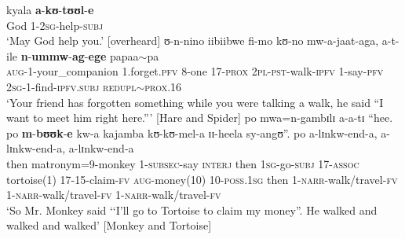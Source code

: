 \begin{exe}
\ex \label{exSUBJvolitive1}
\gll kyala \textbf{a}-\textbf{kʊ}-\textbf{tʊʊl}-\textbf{e}\\
God 1-\textsc{2sg}-help-\textsc{subj}\\
\glt `May God help you.' [overheard]
\ex \label{exSUBJvolitive2}
\gll ʊ-n-nino iibiibwe fi-mo kʊ-no mw-a-jaat-aga, a-t-ile \textbf{n}-\textbf{ummw}-\textbf{ag}-\textbf{ege} papaa$\sim$pa\\
\textsc{aug}-1-your\_companion \textsc{1}.forget.\textsc{pfv} 8-one 17-\textsc{prox} \textsc{2pl}-\textsc{pst}-walk-\textsc{ipfv} 1-say-\textsc{pfv} \textsc{2sg}-1-find-\textsc{ipfv.subj} \textsc{redupl}$\sim$\textsc{prox.16}\\
\glt `Your friend has forgotten something while you were talking a walk, he said ``I want to meet him right here.''{}' [Hare and Spider]
\ex \label{exSUBJannounce}
\gll po mwa=n-gambɪlɪ a-a-tɪ ``hee. po \textbf{m}-\textbf{bʊʊk}-\textbf{e} kw-a kajamba kʊ-kʊ-mel-a ɪɪ-heela sy-angʊ''. po a-lɪnkw-end-a,  a-lɪnkw-end-a,  a-lɪnkw-end-a\\
then matronym=9-monkey 1-\textsc{subsec}-say \phantom{\lq\lq}\textsc{interj} then \textsc{1sg}-go-\textsc{subj} 17-\textsc{assoc} tortoise(1) 17-15-claim-\textsc{fv} \textsc{aug}-money(10) 10-\textsc{poss.1sg} then 1-\textsc{narr}-walk/travel-\textsc{fv} 1-\textsc{narr}-walk/travel-\textsc{fv} 1-\textsc{narr}-walk/travel-\textsc{fv}\\
\glt `So Mr. Monkey said \textup{\lq\lq}I'll go to Tortoise to claim my money\textup{''}. He walked and walked and walked' [Monkey and Tortoise] %
\end{exe}

